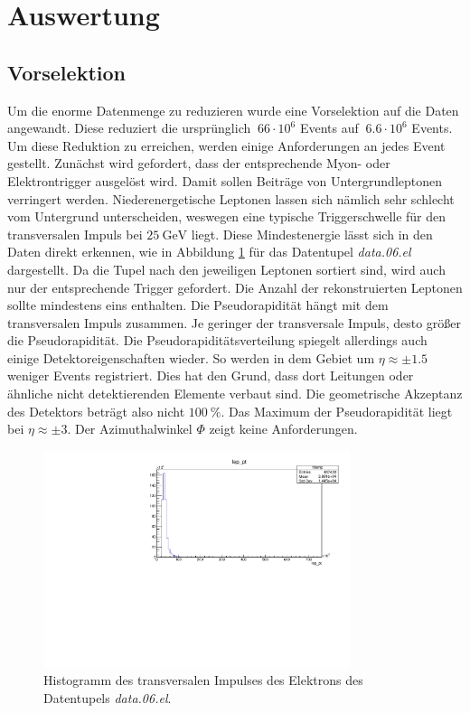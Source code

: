 \section{Auswertung}
\subsection{Vorselektion}

Um die enorme Datenmenge zu reduzieren wurde eine Vorselektion auf die Daten angewandt.
Diese reduziert die ursprünglich $~ 66 \cdot 10^6$ Events auf $~ 6.6 \cdot 10^6$ Events.
Um diese Reduktion zu erreichen, werden einige Anforderungen an jedes Event gestellt.
Zunächst wird gefordert, dass der entsprechende Myon- oder Elektrontrigger ausgelöst wird.
Damit sollen Beiträge von Untergrundleptonen verringert werden.
Niederenergetische Leptonen lassen sich nämlich sehr schlecht vom Untergrund unterscheiden, weswegen eine typische Triggerschwelle für den transversalen Impuls bei $\SI{25}{\giga\electronvolt}$ liegt.
Diese Mindestenergie lässt sich in den Daten direkt erkennen, wie in Abbildung \ref{fig:elec6pt} für das Datentupel \textit{data.06.el} dargestellt.
Da die Tupel nach den jeweiligen Leptonen sortiert sind, wird auch nur der entsprechende Trigger gefordert.
Die Anzahl der rekonstruierten Leptonen sollte mindestens eins enthalten.
Die Pseudorapidität hängt mit dem transversalen Impuls zusammen.
Je geringer der transversale Impuls, desto größer die Pseudorapidität.
Die Pseudorapiditätsverteilung spiegelt allerdings auch einige Detektoreigenschaften wieder.
So werden in dem Gebiet um $\eta \approx \pm 1.5$ weniger Events registriert.
Dies hat den Grund, dass dort Leitungen oder ähnliche nicht detektierenden Elemente verbaut sind.
Die geometrische Akzeptanz des Detektors beträgt also nicht $\SI{100}{\percent}$.
Das Maximum der Pseudorapidität liegt bei $\eta \approx \pm 3$.
Der Azimuthalwinkel $\Phi$ zeigt keine Anforderungen.

\begin{figure}
  \centering
  \includegraphics[width=0.8\textwidth]{content/graphics/question2_1/data_electron_6_pt.pdf}
  \caption{Histogramm des transversalen Impulses des Elektrons des Datentupels \textit{data.06.el}.}
  \label{fig:elec6pt}
\end{figure}
